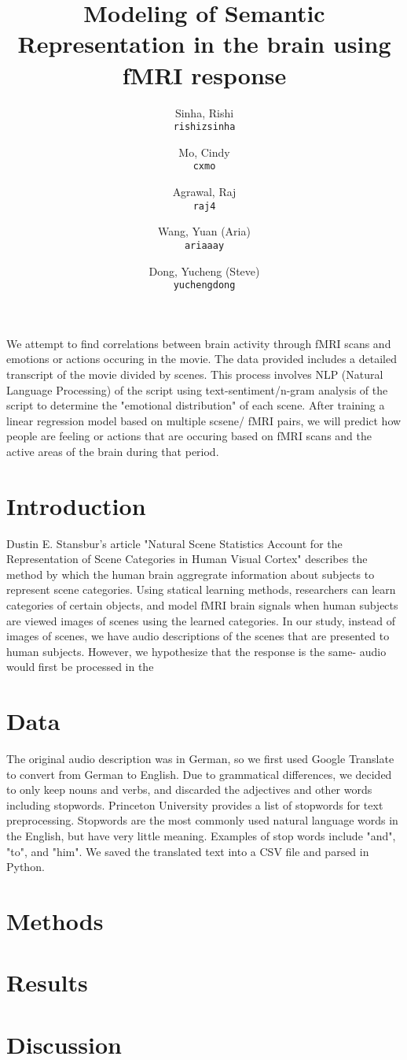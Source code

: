 \documentclass[11pt]{article}
\title{Modeling of Semantic Representation in the brain using fMRI response}
\author{
  Sinha, Rishi\\
  \texttt{rishizsinha}
  \and
  Mo, Cindy\\
  \texttt{cxmo}
  \and
  Agrawal, Raj\\
  \texttt{raj4}
  \and
  Wang, Yuan (Aria)\\
  \texttt{ariaaay}
  \and
  Dong, Yucheng (Steve)\\
  \texttt{yuchengdong}
}
\begin{document}
\maketitle

We attempt to find correlations between brain activity through fMRI scans and emotions 
or actions occuring in the movie. The data provided includes a detailed transcript of 
the movie divided by scenes. This process involves NLP (Natural Language Processing) of 
the script using text-sentiment/n-gram analysis of the script to determine the "emotional 
distribution" of each scene. After training a linear regression model based on multiple 
scsene/ fMRI pairs, we will predict how people are feeling or actions that are occuring 
based on fMRI scans and the active areas of the brain during that period.  

\section{Introduction}
Dustin E. Stansbur's article "Natural Scene Statistics Account for the Representation of 
Scene Categories in Human Visual Cortex" describes the method by which the human brain 
aggregrate information about subjects to represent scene categories. Using statical learning 
methods, researchers can learn categories of certain objects, and model fMRI brain signals 
when human subjects are viewed images of scenes using the learned categories. In our study, 
instead of images of scenes, we have audio descriptions of the scenes that are presented to 
human subjects. However, we hypothesize that the response is the same- audio would first be 
processed in the  

\section{Data}
 The original audio description was in German, so we first used Google Translate 
 to convert from German to English. Due to grammatical differences, we decided to
 only keep nouns and verbs, and discarded the adjectives and other words including
 stopwords. Princeton University provides a list of stopwords for text preprocessing.
 Stopwords are the most commonly used natural language words in the English, but have 
 very little meaning. Examples of stop words include "and", "to", and "him". We saved 
 the translated text into a CSV file and parsed in Python. 

\section{Methods}
\section{Results}
\section{Discussion}



\end{document}
